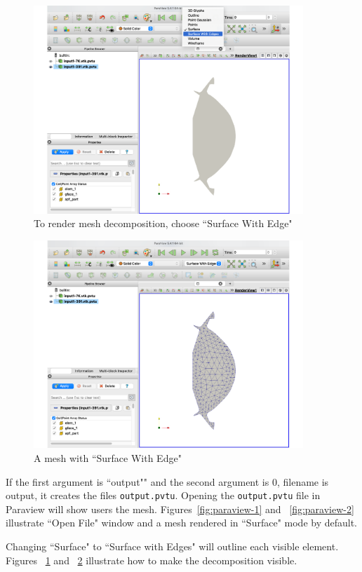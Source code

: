 \begin{figure}
\centering
\includegraphics[width=4in]{./figures/paraview-fig3.pdf}
\caption{To render mesh decomposition, choose ``Surface With Edge"}
\label{fig:paraview-3}
\end{figure}


\begin{figure}
\centering
\includegraphics[width=4in]{./figures/paraview-fig4.pdf}
\caption{A mesh with ``Surface With Edge"}
\label{fig:paraview-4}
\end{figure}

If the first argument is ``output"" and the second argument is 0, filename is output, it creates the files \texttt{output.pvtu}. Opening the \texttt{output.pvtu} file in Paraview will show users the
mesh. Figures~\ref{fig:paraview-1} and ~\ref{fig:paraview-2} illustrate ``Open File" window and a mesh rendered in ``Surface" mode by default.


Changing ``Surface" to ``Surface with Edges" will outline each visible element.
Figures ~\ref{fig:paraview-3} and ~\ref{fig:paraview-4} illustrate how to make the decomposition visible.

